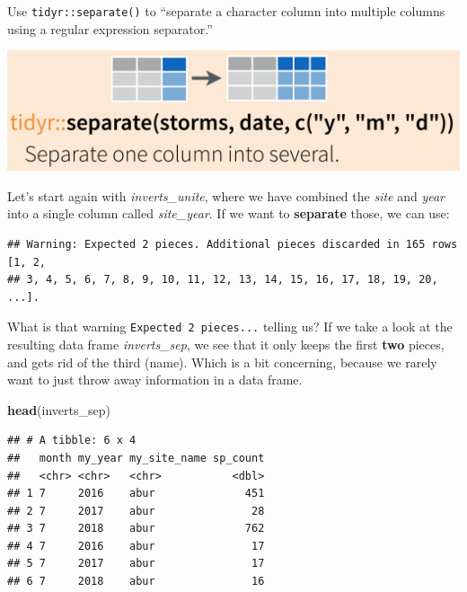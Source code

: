 \documentclass[]{book}
\newenvironment{Shaded}{\begin{snugshade}}{\end{snugshade}}
\newcommand{\DataTypeTok}[1]{\textcolor[rgb]{0.13,0.29,0.53}{#1}}
\newcommand{\KeywordTok}[1]{\textcolor[rgb]{0.13,0.29,0.53}{\textbf{#1}}}
\newcommand{\NormalTok}[1]{#1}
\newcommand{\OperatorTok}[1]{\textcolor[rgb]{0.81,0.36,0.00}{\textbf{#1}}}
\newcommand{\StringTok}[1]{\textcolor[rgb]{0.31,0.60,0.02}{#1}}
\begin{document}
Use \texttt{tidyr::separate()} to ``separate a character column into multiple columns using a regular expression separator.''

\includegraphics{img/rstudio-cheatsheet-separate.png}

Let's start again with \emph{inverts\_unite}, where we have combined the \emph{site} and \emph{year} into a single column called \emph{site\_year}. If we want to \textbf{separate} those, we can use:

\begin{Shaded}
\end{Shaded}

\begin{verbatim}
## Warning: Expected 2 pieces. Additional pieces discarded in 165 rows [1, 2,
## 3, 4, 5, 6, 7, 8, 9, 10, 11, 12, 13, 14, 15, 16, 17, 18, 19, 20, ...].
\end{verbatim}

What is that warning \texttt{Expected\ 2\ pieces...} telling us? If we take a look at the resulting data frame \emph{inverts\_sep}, we see that it only keeps the first \textbf{two} pieces, and gets rid of the third (name). Which is a bit concerning, because we rarely want to just throw away information in a data frame.

\begin{Shaded}
\begin{Highlighting}[]
\KeywordTok{head}\NormalTok{(inverts_sep)}
\end{Highlighting}
\end{Shaded}

\begin{verbatim}
## # A tibble: 6 x 4
##   month my_year my_site_name sp_count
##   <chr> <chr>   <chr>           <dbl>
## 1 7     2016    abur              451
## 2 7     2017    abur               28
## 3 7     2018    abur              762
## 4 7     2016    abur               17
## 5 7     2017    abur               17
## 6 7     2018    abur               16
\end{verbatim}
\end{document}

